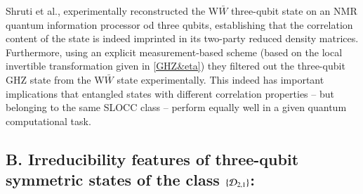 Shruti et al., \cite{arvind} experimentally reconstructed the W$\bar W$ three-qubit state on an NMR quantum information processor od three qubits,  establishing that the correlation content of the state is indeed imprinted in  its two-party reduced density matrices. Furthermore, using an explicit measurement-based scheme (based on the local invertible transformation given in \eqref{GHZ&eta})  they filtered out the  three-qubit GHZ state from the W$\bar W$ state experimentally. This indeed has important implications that  entangled states with different correlation properties -- but  belonging to the same SLOCC class -- perform equally well in a given quantum computational task.

\subsection*{B. Irreducibility features of three-qubit symmetric states of the class $\{{\cal D}_{2,1} \}$:}

